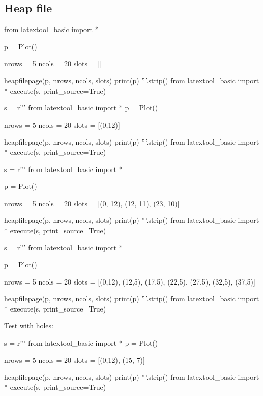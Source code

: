 \subsection{Heap file}

\begin{python}
from latextool_basic import *

p = Plot()

nrows = 5
ncols = 20
slots = []

heapfilepage(p, nrows, ncols, slots)
print(p)
'''.strip()
from latextool_basic import *
execute(s, print_source=True)
\end{python}

\begin{python}
s = r'''
from latextool_basic import *
p = Plot()

nrows = 5
ncols = 20
slots = [(0,12)]

heapfilepage(p, nrows, ncols, slots)
print(p)
'''.strip()
from latextool_basic import *
execute(s, print_source=True)
\end{python}


\begin{python}
s = r'''
from latextool_basic import *

p = Plot()

nrows = 5
ncols = 20
slots = [(0, 12), (12, 11), (23, 10)]

heapfilepage(p, nrows, ncols, slots)
print(p)
'''.strip()
from latextool_basic import *
execute(s, print_source=True)
\end{python}

\begin{python}
s = r'''
from latextool_basic import *

p = Plot()

nrows = 5
ncols = 20
slots = [(0,12), (12,5), (17,5), (22,5), (27,5), (32,5), (37,5)]

heapfilepage(p, nrows, ncols, slots)
print(p)
'''.strip()
from latextool_basic import *
execute(s, print_source=True)
\end{python}



\newpage
Test with holes:
\begin{python}
s = r'''
from latextool_basic import *
p = Plot()

nrows = 5
ncols = 20
slots = [(0,12), (15, 7)]

heapfilepage(p, nrows, ncols, slots)
print(p)
'''.strip()
from latextool_basic import *
execute(s, print_source=True)
\end{python}



